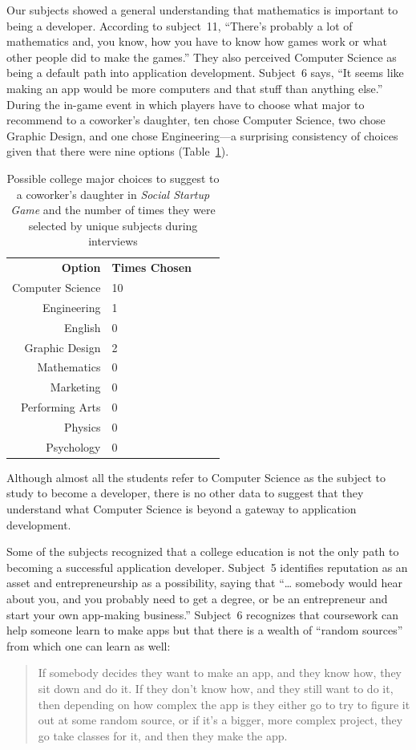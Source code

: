 \documentclass[letterpaper]{article}
\begin{document}
Our subjects showed a general understanding that mathematics is important
to being a developer. According to subject~11, 
``There's probably a lot of mathematics and, you know, how you have to
know how games work or what other people did to make the games.''
% 
They also perceived Computer Science as being a default path into
application development.  Subject~6 says, ``It seems like making an
app would be more computers and that stuff than anything else.''
During the in-game event in which players have to choose what major to recommend
to a coworker's daughter, ten chose Computer Science, two chose 
Graphic Design, and one chose Engineering---a surprising consistency
of choices given that there were nine options (Table~\ref{tab:child-advice}).
%
\begin{table}
\begin{framed}
\centering
\begin{tabular}{rlrl}
\textbf{Option} & \textbf{Times Chosen}\\
Computer Science & 10\\
Engineering & 1\\
English & 0\\
Graphic Design & 2\\
Mathematics & 0\\
Marketing & 0\\
Performing Arts & 0\\
Physics & 0\\
Psychology & 0
\end{tabular}
\caption{Possible college major choices to suggest to a coworker's daughter 
 in \textit{Social Startup Game} and the number of times they were
 selected by unique subjects during interviews}
\label{tab:child-advice}
\end{framed}
\end{table}
%
Although almost all the students refer to Computer Science as the
subject to study to become a developer, there is no other data
to suggest that they understand what Computer Science is beyond a gateway
to application development.

Some of the subjects recognized that a college education is not the only
path to becoming a successful application developer.
Subject~5 identifies reputation as an asset and entrepreneurship as a 
possibility, saying that ``\ldots{} somebody would hear about you, and you probably need to get a degree, or be an entrepreneur and start your own app-making business.''
Subject~6 recognizes that coursework can help someone learn to make apps
but that there is a wealth of ``random sources'' from which one can learn
as well:
\begin{quote}
If somebody decides they want to make 
an app, and they know how, they sit down and do it. If they don't know how,
and they still want to do it, then depending on how complex the app is they 
either go to try to figure it out at some random source, or if it's a bigger,
more complex project, they go take classes for it, and then they make the app.
\end{quote}
\end{document}
